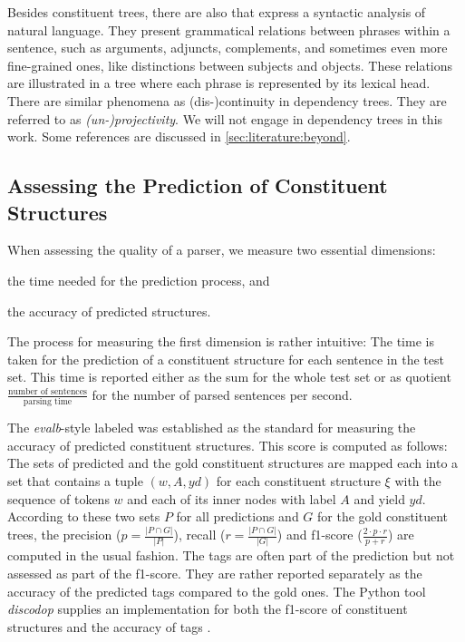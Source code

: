 \documentclass[../document.tex]{subfiles}
\begin{document}
    Besides constituent trees, there are also  that express a syntactic analysis of natural language.
    They present grammatical relations between phrases within a sentence, such as arguments, adjuncts, complements, and sometimes even more fine-grained ones, like distinctions between subjects and objects.
    These relations are illustrated in a tree where each phrase is represented by its lexical head.
    There are similar phenomena as (dis-)continuity in dependency trees. They are referred to as \emph{(un-)projectivity}.
    We will not engage in dependency trees in this work. Some references are discussed in \cref{sec:literature:beyond}.

    \subsection{Assessing the Prediction of Constituent Structures}
    When assessing the quality of a parser, we measure two essential dimensions:
    \begin{inparaenum}
        \item the time needed for the prediction process, and
        \item the accuracy of predicted structures.
    \end{inparaenum}
    The process for measuring the first dimension is rather intuitive:
        The time is taken for the prediction of a constituent structure for each sentence in the test set.
    This time is reported either as the sum for the whole test set or as quotient \(\frac{\text{number of sentences}}{\text{parsing time}}\) for the number of parsed sentences per second.

    The \emph{evalb}-style labeled  \citep{Black91,Col97} was established as the standard for measuring the accuracy of predicted constituent structures.
    This score is computed as follows:
    The sets of predicted and the gold constituent structures are mapped each into a set that contains a tuple \((w, A, \mathit{yd})\) for each constituent structure \(\xi\) with the sequence of tokens \(w\) and each of its inner nodes with label \(A\) and yield \(\mathit{yd}\).
    According to these two sets \(P\) for all predictions and \(G\) for the gold constituent trees, the precision (\(p = \frac{|P \cap G|}{|P|}\)), recall (\(r = \frac{|P \cap G|}{|G|}\)) and f1-score (\(\frac{2\cdot p\cdot r}{p + r}\)) are computed in the usual fashion.
    The  tags are often part of the prediction but not assessed as part of the f1-score.
    They are rather reported separately as the accuracy of the predicted  tags compared to the gold ones.
    The Python tool \emph{discodop} supplies an implementation for both the f1-score of constituent structures and the accuracy of  tags \citep{CraSchBod16}.
\end{document}
